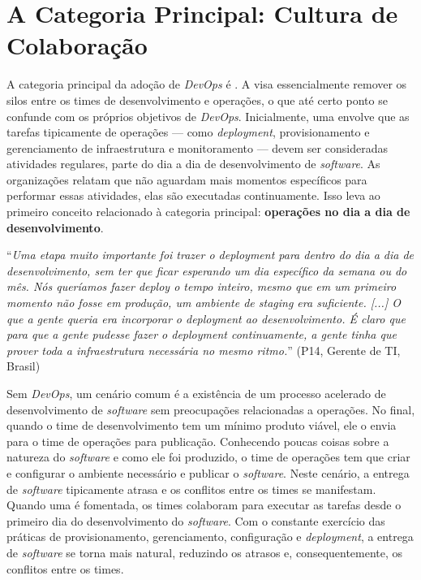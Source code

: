 \section{A Categoria Principal: Cultura de Colaboração}\label{secao_core_category}

A categoria principal da adoção de {\it DevOps} é \cc. A \cc visa essencialmente
remover os silos entre os times de desenvolvimento e operações, o que até certo
ponto se confunde com os próprios objetivos de {\it DevOps}. Inicialmente, uma
\cc envolve que as tarefas tipicamente de operações --- como {\it deployment},
provisionamento e gerenciamento de infraestrutura e monitoramento --- devem ser
consideradas atividades regulares, parte do dia a dia de desenvolvimento de
{\it software}. As organizações relatam que não aguardam mais momentos específicos
para performar essas atividades, elas são executadas continuamente. Isso leva
ao primeiro conceito relacionado à categoria principal: {\bf operações no dia
a dia de desenvolvimento}.

\begin{mq}
``\emph{Uma etapa muito importante foi trazer o {\it deployment} para dentro do
dia a dia de desenvolvimento, sem ter que ficar esperando um dia específico
da semana ou do mês. Nós queríamos fazer {\it deploy} o tempo inteiro, mesmo
que em um primeiro momento não fosse em produção, um ambiente de {\it staging}
era suficiente. [...] O que a gente queria era incorporar o {\it deployment} ao
desenvolvimento. É claro que para que a gente pudesse fazer o {\it deployment}
continuamente, a gente tinha que prover toda a infraestrutura necessária no
mesmo ritmo.}'' (P14, Gerente de \acrshort{TI}, Brasil)
\end{mq}

Sem {\it DevOps}, um cenário comum é a existência de um processo acelerado de
desenvolvimento de {\it software} sem preocupações relacionadas a operações.
No final, quando o time de desenvolvimento tem um mínimo produto viável, ele
o envia para o time de operações para publicação. Conhecendo poucas coisas sobre
a natureza do {\it software} e como ele foi produzido, o time de operações tem
que criar e configurar o ambiente necessário e publicar o {\it software}. Neste
cenário, a entrega de {\it software} tipicamente atrasa e os conflitos entre
os times se manifestam. Quando uma \cc é fomentada, os times colaboram para
executar as tarefas desde o primeiro dia do desenvolvimento do {\it software}.
Com o constante exercício das práticas de provisionamento, gerenciamento,
configuração e {\it deployment}, a entrega de {\it software} se torna mais
natural, reduzindo os atrasos e, consequentemente, os conflitos entre os times.

